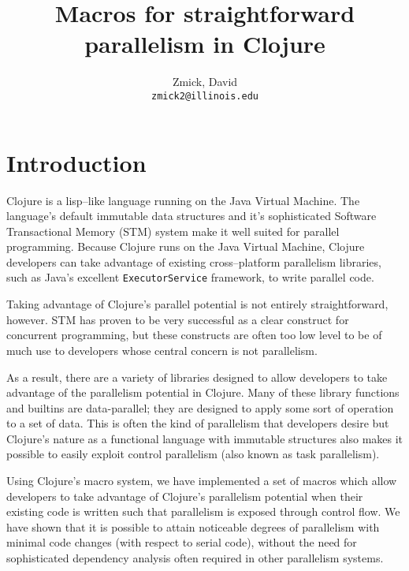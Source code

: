 \documentclass{sig-alternate}
\author{
    Zmick, David\\
    \texttt{zmick2@illinois.edu}
}
\title{Macros for straightforward parallelism in Clojure}
\def\code#1{\mbox{\texttt{#1}}}
\begin{document}
\maketitle

\section{Introduction}
Clojure is a lisp--like language running on the Java Virtual Machine.
The language's default immutable data structures and it's sophisticated Software Transactional Memory (STM) system make it well suited for parallel programming.
Because Clojure runs on the Java Virtual Machine, Clojure developers can take advantage of existing cross--platform parallelism libraries, such as Java's excellent \code{ExecutorService} framework, to write parallel code.

Taking advantage of Clojure's parallel potential is not entirely straightforward, however.
STM has proven to be very successful as a clear construct for concurrent programming\cite{Jones2007a}, but these constructs are often too low level to be of much use to developers whose central concern is not parallelism\cite{Boehm2009}.

As a result, there are a variety of libraries designed to allow developers to take advantage of the parallelism potential in Clojure.\footnotemark{}\footnotemark{}\footnotemark{}\footnotemark{}\footnotemark{}
Many of these library functions and builtins are data-parallel; they are designed to apply some sort of operation to a set of data.
This is often the kind of parallelism that developers desire\cite{Okur2012a} but Clojure's nature as a functional language with immutable structures also makes it possible to easily exploit control parallelism (also known as task parallelism\cite{Andradea}).


Using Clojure's macro system, we have implemented a set of macros which allow developers to take advantage of Clojure's parallelism potential when their existing code is written such that parallelism is exposed through control flow.
We have shown that it is possible to attain noticeable degrees of parallelism with minimal code changes (with respect to serial code), without the need for sophisticated dependency analysis  often required in other parallelism systems.
\end{document}

